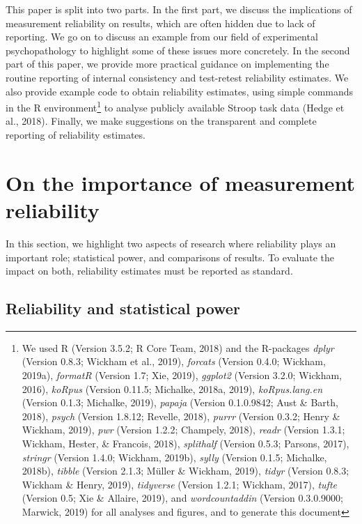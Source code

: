 \documentclass[english,,man,floatsintext]{apa6}
\let\rmarkdownfootnote\footnote%
\def\footnote{\protect\rmarkdownfootnote}
\begin{document}
This paper is split into two parts. In the first part, we discuss the implications of measurement reliability on results, which are often hidden due to lack of reporting. We go on to discuss an example from our field of experimental psychopathology to highlight some of these issues more concretely. In the second part of this paper, we provide more practical guidance on implementing the routine reporting of internal consistency and test-retest reliability estimates. We also provide example code to obtain reliability estimates, using simple commands in the R environment\footnote{We used R (Version 3.5.2; R Core Team, 2018) and the R-packages \emph{dplyr} (Version 0.8.3; Wickham et al., 2019), \emph{forcats} (Version 0.4.0; Wickham, 2019a), \emph{formatR} (Version 1.7; Xie, 2019), \emph{ggplot2} (Version 3.2.0; Wickham, 2016), \emph{koRpus} (Version 0.11.5; Michalke, 2018a, 2019), \emph{koRpus.lang.en} (Version 0.1.3; Michalke, 2019), \emph{papaja} (Version 0.1.0.9842; Aust \& Barth, 2018), \emph{psych} (Version 1.8.12; Revelle, 2018), \emph{purrr} (Version 0.3.2; Henry \& Wickham, 2019), \emph{pwr} (Version 1.2.2; Champely, 2018), \emph{readr} (Version 1.3.1; Wickham, Hester, \& Francois, 2018), \emph{splithalf} (Version 0.5.3; Parsons, 2017), \emph{stringr} (Version 1.4.0; Wickham, 2019b), \emph{sylly} (Version 0.1.5; Michalke, 2018b), \emph{tibble} (Version 2.1.3; Müller \& Wickham, 2019), \emph{tidyr} (Version 0.8.3; Wickham \& Henry, 2019), \emph{tidyverse} (Version 1.2.1; Wickham, 2017), \emph{tufte} (Version 0.5; Xie \& Allaire, 2019), and \emph{wordcountaddin} (Version 0.3.0.9000; Marwick, 2019) for all analyses and figures, and to generate this document} to analyse publicly available Stroop task data (Hedge et al., 2018). Finally, we make suggestions on the transparent and complete reporting of reliability estimates.

\hypertarget{on-the-importance-of-measurement-reliability}{%
\section{On the importance of measurement reliability}\label{on-the-importance-of-measurement-reliability}}

In this section, we highlight two aspects of research where reliability plays an important role; statistical power, and comparisons of results. To evaluate the impact on both, reliability estimates must be reported as standard.

\hypertarget{reliability-and-statistical-power}{%
\subsection{Reliability and statistical power}\label{reliability-and-statistical-power}}
\end{document}
